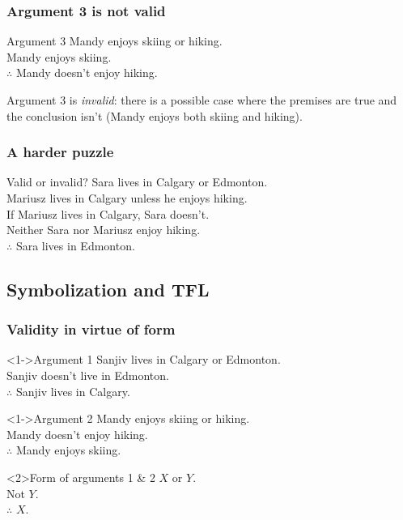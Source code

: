 \begin{frame}
  \frametitle{Argument 3 is not valid}

  \begin{block}{Argument 3}
  Mandy enjoys skiing or hiking.\\
  Mandy enjoys skiing.\\
  $\therefore$ Mandy doesn't enjoy hiking.
  \end{block}

  Argument 3 is \emph{invalid}: there is a possible case where the
  premises are true and the conclusion isn't (Mandy enjoys both skiing
  and hiking).

\end{frame}

\begin{frame}
  \frametitle{A harder puzzle}

  \begin{block}{Valid or invalid?}
  Sara lives in Calgary or Edmonton.\\
  Mariusz lives in Calgary unless he enjoys hiking.\\
  If Mariusz lives in Calgary, Sara doesn't.\\
  Neither Sara nor Mariusz enjoy hiking.\\
  $\therefore$ Sara lives in Edmonton.
  \end{block}

\end{frame}

\subsection{Symbolization and TFL}

\begin{frame}
  \frametitle{Validity in virtue of form}

  \begin{block}<1->{Argument 1}
  Sanjiv lives in Calgary or Edmonton.\\
  Sanjiv doesn't live in Edmonton.\\
  $\therefore$ Sanjiv lives in Calgary.
  \end{block}

  \begin{block}<1->{Argument 2}
  Mandy enjoys skiing or hiking.\\
  Mandy doesn't enjoy hiking.\\
  $\therefore$ Mandy enjoys skiing.
  \end{block}

  \begin{block}<2>{Form of arguments 1 \& 2}
  $X$ or $Y$.\\
  Not $Y$.\\
  $\therefore$ $X$.
  \end{block}

\end{frame}

